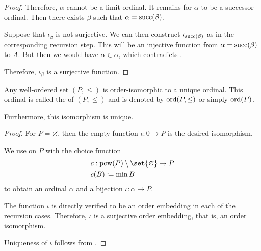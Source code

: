 \begin{proof}
  Therefore, \( \alpha \) cannot be a limit ordinal. It remains for \( \alpha \) to be a successor ordinal. Then there exists \( \beta \) such that \( \alpha = \operatorname{succ}(\beta) \).

  Suppose that \( \iota_\beta \) is not surjective. We can then construct \( \iota_{\operatorname{succ}(\beta)} \) as in the corresponding recursion step. This will be an injective function from \( \alpha = \operatorname{succ}(\beta) \) to \( A \). But then we would have \( \alpha \in \alpha \), which contradicts .

  Therefore, \( \iota_\beta \) is a surjective function.
\end{proof}

\begin{theorem}\label{thm:well_ordered_order_type_existence}
  Any \hyperref[def:well_ordered_set]{well-ordered set} \( (P, \leq) \) is \hyperref[def:preordered_set/homomorphism]{order-isomorphic} to a unique ordinal. This ordinal is called the  of \( (P, \leq) \) and is denoted by \( \operatorname{ord}(P, \leq) \) or simply \( \operatorname{ord}(P) \).

  Furthermore, this isomorphism is unique.
\end{theorem}
\begin{proof}
  For \( P = \varnothing \), then the empty function \( \iota: 0 \to P \) is the desired isomorphism.

  We use  on \( P \) with the choice function
  \begin{equation*}
    \begin{aligned}
      &c: \pow(P) \setminus \set{ \varnothing } \to P \\
      &c(B) \coloneqq \min B
    \end{aligned}
  \end{equation*}
  to obtain an ordinal \( \alpha \) and a bijection \( \iota: \alpha \to P \).

  The function \( \iota \) is directly verified to be an order embedding in each of the recursion cases. Therefore, \( \iota \) is a surjective order embedding, that is, an order isomorphism.

  Uniqueness of \( \iota \) follows from .
\end{proof}

